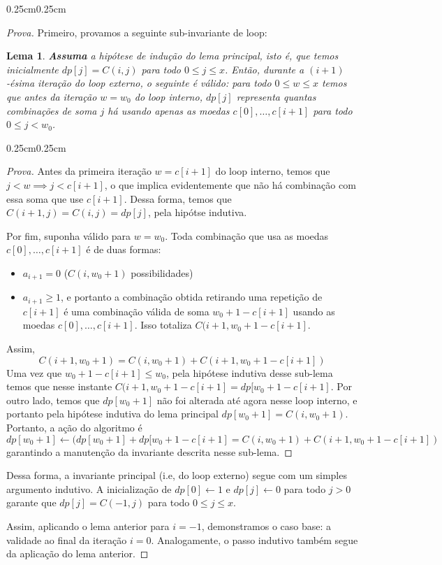 \documentclass{article}
\newtheorem{lemma}{Lema}[section]
\newenvironment{proofenv}{\begin{adjustwidth}{0.25cm}{0.25cm}\begin{proof}[Prova]}{\end{proof}\end{adjustwidth}}
\begin{document}
\begin{proofenv}
	Primeiro, provamos a seguinte sub-invariante de loop:
	\begin{lemma}
		\textbf{Assuma} a hipótese de indução do lema principal, isto é, que temos inicialmente \(dp[j] = C(i, j)\) para todo \(0 \leq j \leq x\). Então, durante a \((i+1)\)-ésima iteração do loop externo, o seguinte é válido: para todo \(0 \leq w \leq x\) temos que antes da iteração \(w = w_0\) do loop interno, \(dp[j]\) representa quantas combinações de soma \(j\) há usando apenas as moedas \(c[0], \dotsc, c[i+1]\) para todo \(0 \leq j < w_0\).
	\end{lemma}
	\begin{proofenv}
		Antes da primeira iteração \(w = c[i+1]\) do loop interno, temos que \(j < w \implies j < c[i+1]\), o que implica evidentemente que não há combinação com essa soma que use \(c[i+1]\). Dessa forma, temos que \(C(i + 1, j) = C(i, j) = dp[j]\), pela hipótse indutiva.

		Por fim, suponha válido para \(w = w_0\). Toda combinação que usa as moedas \(c[0], \dotsc, c[i+1]\) é de duas formas: 
		\begin{itemize}
			\item \(a_{i+1} = 0\) (\(C(i, w_0 + 1)\) possibilidades)
			\item \(a_{i+1} \geq 1\), e portanto a combinação obtida retirando uma repetição de \(c[i+1]\) é uma combinação válida de soma \(w_0 + 1 - c[i+1]\) usando as moedas \(c[0], \dotsc, c[i+1]\). Isso totaliza \(C(i + 1, w_0 + 1 - c[i+1]\).
		\end{itemize}
		Assim,
		\[C(i + 1, w_0 + 1) = C(i, w_0 + 1) + C(i + 1, w_0 + 1 - c[i+1])\]
		Uma vez que \(w_0 + 1 - c[i+1] \leq w_0\), pela hipótese indutiva desse sub-lema temos que nesse instante \(C(i+1, w_0 + 1 - c[i+1] = dp[w_0 + 1 - c[i+1]\). Por outro lado, temos que \(dp[w_0 + 1]\) não foi alterada até agora nesse loop interno, e portanto pela hipótese indutiva do lema principal \(dp[w_0 + 1] = C(i, w_0 + 1)\). Portanto, a ação do algoritmo é 
		\[dp[w_0 + 1] \gets (dp[w_0 + 1] + dp[w_0 + 1 - c[i+1] = C(i, w_0 + 1) + C(i + 1, w_0 + 1 - c[i+1])\]
		garantindo a manutenção da invariante descrita nesse sub-lema.
	\end{proofenv}
	Dessa forma, a invariante principal (i.e, do loop externo) segue com um simples argumento indutivo. A inicialização de \(dp[0] \gets 1\) e \(dp[j] \gets 0\) para todo \(j > 0\) garante que \(dp[j] = C(-1, j)\) para todo \(0 \leq j \leq x\). 

	Assim, aplicando o lema anterior para \(i = -1\), demonstramos o caso base: a validade ao final da iteração \(i = 0\). Analogamente, o passo indutivo também segue da aplicação do lema anterior.

\end{proofenv}
\end{document}
